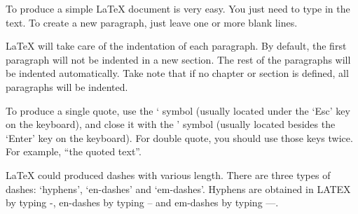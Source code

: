 \documentclass[a4paper,12pt]{article}
\begin{document}
To produce a simple \LaTeX{} document is very easy. You just
need to type in the text. To create a new paragraph,
just leave one or more blank lines.

\LaTeX{} will take care of the indentation of each paragraph.
By default, the first paragraph will not be indented in 
a new section. The rest of the paragraphs will be indented
automatically. Take note that if no chapter or section is 
defined, all paragraphs will be indented.

To produce a single quote, use the ` symbol (usually located
under the `Esc' key on the keyboard), and close it with 
the ' symbol (usually located besides the `Enter' key 
on the keyboard).
For double quote, you should use those keys twice. For
example, ``the quoted text''.

\LaTeX{} could produced dashes with various length. 
There are three types of dashes: `hyphens', `en-dashes'
and `em-dashes'. Hyphens are obtained in LATEX by 
typing -, en-dashes by typing -- and em-dashes by 
typing ---.
\end{document}
